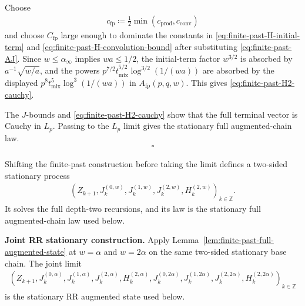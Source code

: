 Choose
\begin{equation}
\begin{aligned}
c_{\text{fp}} \coloneqq \frac{1}{2} \min(c_{\text{prod}}, c_{\text{conv}})
\end{aligned}
\end{equation}
and choose \(C_{\text{fp}}\) large enough to dominate the constants in
\eqref{eq:finite-past-H-initial-term} and \eqref{eq:finite-past-H-convolution-bound} after
substituting \eqref{eq:finite-past-AJ}. Since \(w \le \alpha_\infty\) implies
\(w a \le 1 / 2\), the initial-term factor \(w^{3 / 2}\) is absorbed by
\(a^{-1} \sqrt{w / a}\), and the powers
\(p^{7 / 2} t_{\text{mix}}^{5 / 2} \log^{3 / 2}(1 / (w a))\) are
absorbed by the displayed \(p^8 t_{\text{mix}}^5 \log^3(1 / (w a))\) in
\(A_{\text{fp}}(p,q,w)\). This gives \eqref{eq:finite-past-H2-cauchy}.

The \(J\)-bounds and \eqref{eq:finite-past-H2-cauchy} show that the full terminal vector
is Cauchy in \(L_p\). Passing to the \(L_p\) limit gives the stationary full
augmented-chain law.
\begin{equation}
\begin{aligned}
\square
\end{aligned}
\end{equation}

Shifting the finite-past construction before taking the limit defines a
two-sided stationary process
\begin{equation}
\begin{aligned}
(Z_{k + 1}, J_k^{(0,w)}, J_k^{(1,w)}, J_k^{(2,w)}, H_k^{(2,w)})_{k \in \mathbb{Z}}.
\end{aligned}
\end{equation}
It solves the full depth-two recursions, and its law is the stationary full
augmented-chain law used below.

\textbf{Joint RR stationary construction.} Apply
Lemma~\ref{lem:finite-past-full-augmented-state} at \(w = \alpha\) and \(w = 2 \alpha\) on the
same two-sided stationary base chain.
The joint limit
\begin{equation}
\begin{aligned}
\left(
  Z_{k + 1},
  J_k^{(0, \alpha)}, J_k^{(1, \alpha)}, J_k^{(2, \alpha)},
  H_k^{(2, \alpha)},
  J_k^{(0, 2 \alpha)}, J_k^{(1, 2 \alpha)}, J_k^{(2, 2 \alpha)},
  H_k^{(2, 2 \alpha)}
\right)_{k \in \mathbb{Z}}
\end{aligned}
\end{equation}
is the stationary RR augmented state used below.

